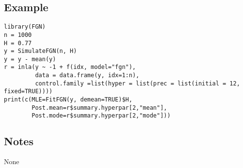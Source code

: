 \documentclass[a4paper,11pt]{article}
\begin{document}
\subsection*{Example}

\begin{verbatim}
library(FGN)
n = 1000
H = 0.77
y = SimulateFGN(n, H)
y = y - mean(y)
r = inla(y ~ -1 + f(idx, model="fgn"), 
         data = data.frame(y, idx=1:n),
         control.family =list(hyper = list(prec = list(initial = 12, fixed=TRUE))))
print(c(MLE=FitFGN(y, demean=TRUE)$H,
        Post.mean=r$summary.hyperpar[2,"mean"],
        Post.mode=r$summary.hyperpar[2,"mode"]))
\end{verbatim}


\subsection*{Notes}

None
\end{document}
